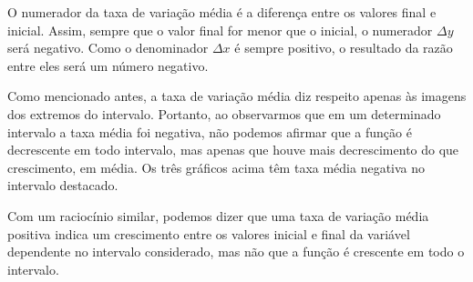 O numerador da taxa de variação média é a diferença entre os valores final e inicial. Assim, sempre que o valor final for menor que o inicial, o numerador $\Delta y$ será negativo. Como o denominador $\Delta x$ é sempre positivo, o resultado da razão entre eles será um número negativo. 

Como mencionado antes, a taxa de variação média diz respeito apenas às imagens dos extremos do intervalo. Portanto, ao observarmos que em um determinado intervalo a taxa média foi negativa, não podemos afirmar que a função é decrescente em todo intervalo, mas apenas que houve mais decrescimento do que crescimento, em média. Os três gráficos acima têm taxa média negativa no intervalo destacado.

Com um raciocínio similar, podemos dizer que uma taxa de variação média positiva indica um crescimento entre os valores inicial e final da variável dependente no intervalo considerado, mas não que a função é crescente em todo o intervalo.

\begin{minipage}{0.5\textwidth}
\end{minipage}
\begin{minipage}{0.5\textwidth}
\end{minipage}

\begin{figure}[H]
\centering
{}
\end{figure}

